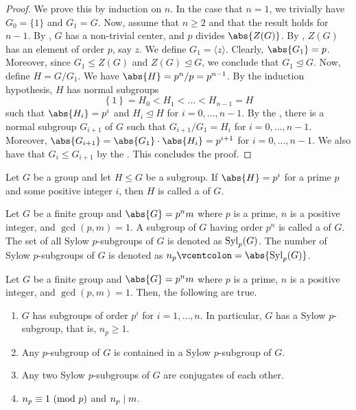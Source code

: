 \begin{proof}
    We prove this by induction on $n$. In the case that $n=1$, we trivially have $G_0 = \{1\}$ and $G_1 = G$. Now, assume that $n \geq 2$ and that the result holds for $n-1$. By , $G$ has a non-trivial center, and $p$ divides $\abs{Z(G)}$. By , $Z(G)$ has an element of order $p$, say $z$. We define $G_1 = \langle z \rangle$. Clearly, $\abs{G_1} = p$. Moreover, since $G_1 \leq Z(G)$ and $Z(G) \trianglelefteq G$, we conclude that $G_1 \trianglelefteq G$. Now, define $H = G/G_1$. We have $\abs{H} = p^n/p = p^{n-1}$. By the induction hypothesis, $H$ has normal subgroups
    \[
        \left\{ 1 \right\} = H_0 < H_1 < \ldots < H_{n-1} = H
    \]
    such that $\abs{H_i} = p^i$ and $H_i \trianglelefteq H$ for $i = 0, \ldots, n-1$. By the , there is a normal subgroup $G_{i+1}$ of $G$ such that $G_{i+1}/G_1 = H_i$ for $i =0, \ldots, n-1$. Moreover, $\abs{G_{i+1}} = \abs{G_1} \cdot \abs{H_i} = p^{i+1}$ for $i=0, \ldots, n-1$. We also have that $G_i \leq G_{i+1}$ by the . This concludes the proof.
\end{proof}

\begin{defn}
    Let $G$ be a group and let $H \leq G$ be a subgroup. If $\abs{H} = p^i$ for a prime $p$ and some positive integer $i$, then $H$ is called a  of $G$.
\end{defn}

\begin{defn}
    Let $G$ be a finite group and $\abs{G} = p^n m$ where $p$ is a prime, $n$ is a positive integer, and $\gcd(p,m) = 1$. A subgroup of $G$ having order $p^n$ is called a  of $G$. The set of all Sylow $p$-subgroups of $G$ is denoted as $\operatorname{Syl}_p(G)$. The number of Sylow $p$-subgroups of $G$ is denoted as $n_p \vcentcolon= \abs{\Syl_p(G)}$.
\end{defn}

\begin{theorem} \label{thm:sylow}
Let $G$ be a finite group and $\abs{G} = p^n m$ where $p$ is a prime, $n$ is a positive integer, and $\gcd(p,m) = 1$. Then, the following are true.
\begin{enumerate}
    \item $G$ has subgroups of order $p^i$ for $i = 1, \ldots, n$. In particular, $G$ has a Sylow $p$-subgroup, that is, $n_p \geq 1$.
    \item Any $p$-subgroup of $G$ is contained in a Sylow $p$-subgroup of $G$.
    \item Any two Sylow $p$-subgroups of $G$ are conjugates of each other. 
    \item $n_p \equiv 1 \ (\mathrm{mod}\ p)$ and $n_p \mid m$. 
\end{enumerate}
\end{theorem}

